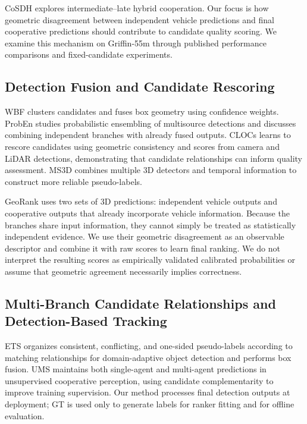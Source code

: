 CoSDH \cite{ref1} explores intermediate--late hybrid cooperation. Our focus is how geometric disagreement between independent vehicle predictions and final cooperative predictions should contribute to candidate quality scoring. We examine this mechanism on Griffin-55m through published performance comparisons and fixed-candidate experiments.

\subsection{Detection Fusion and Candidate Rescoring}

WBF \cite{ref7} clusters candidates and fuses box geometry using confidence weights. ProbEn \cite{ref8} studies probabilistic ensembling of multisource detections and discusses combining independent branches with already fused outputs. CLOCs \cite{ref9} learns to rescore candidates using geometric consistency and scores from camera and LiDAR detections, demonstrating that candidate relationships can inform quality assessment. MS3D \cite{ref10} combines multiple 3D detectors and temporal information to construct more reliable pseudo-labels.

GeoRank uses two sets of 3D predictions: independent vehicle outputs and cooperative outputs that already incorporate vehicle information. Because the branches share input information, they cannot simply be treated as statistically independent evidence. We use their geometric disagreement as an observable descriptor and combine it with raw scores to learn final ranking. We do not interpret the resulting scores as empirically validated calibrated probabilities or assume that geometric agreement necessarily implies correctness.

\subsection{Multi-Branch Candidate Relationships and Detection-Based Tracking}

ETS \cite{ref11} organizes consistent, conflicting, and one-sided pseudo-labels according to matching relationships for domain-adaptive object detection and performs box fusion. UMS \cite{ref12} maintains both single-agent and multi-agent predictions in unsupervised cooperative perception, using candidate complementarity to improve training supervision. Our method processes final detection outputs at deployment; GT is used only to generate labels for ranker fitting and for offline evaluation.

